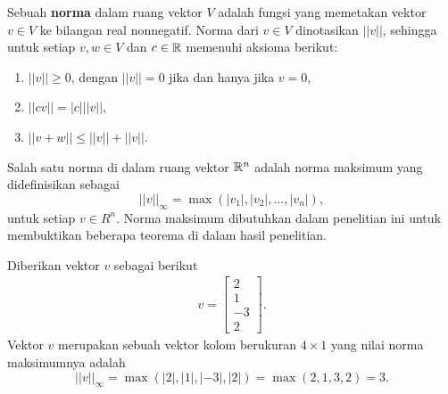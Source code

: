 \begin{definisi}\citep{olver}
    Sebuah \textbf{norma} dalam ruang vektor $V$ adalah fungsi yang memetakan vektor $v \in V$ ke bilangan real nonnegatif. Norma dari $v \in V$ dinotasikan $||v||$, sehingga untuk setiap $v, w \in V$ dan $c \in \mathbb{R}$ memenuhi aksioma berikut:
    \begin{enumerate}
        \item $||v|| \geq 0$, dengan $||v|| = 0$ jika dan hanya jika $v=0$,
        \item $||cv|| = |c|||v||$,
        \item $||v+w|| \leq ||v|| + ||v||$.
    \end{enumerate}
\end{definisi}

Salah satu norma di dalam ruang vektor $\mathbb{R}^n$ adalah norma maksimum yang didefinisikan sebagai
$$||v||_\infty = \max(|v_1|,|v_2|,\dots,|v_n|),$$
untuk setiap $v \in R^n$. Norma maksimum dibutuhkan dalam penelitian ini untuk membuktikan beberapa teorema di dalam hasil penelitian.
\begin{contoh}
Diberikan vektor $v$ sebagai berikut
    \begin{align*}
        v=
        \begin{bmatrix}
            2\\
            1\\
            -3\\
            2
        \end{bmatrix}.
    \end{align*}
    Vektor $v$ merupakan sebuah vektor kolom berukuran $4 \times 1$ yang nilai norma maksimumnya adalah
    \begin{equation*}
        ||v||_\infty=\max(|2|,|1|,|-3|,|2|)=\max(2,1,3,2)=3.
    \end{equation*}
\end{contoh}

